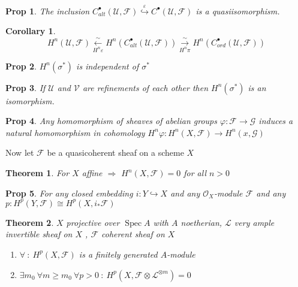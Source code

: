 \documentclass[a4paper, 12pt]{article}
\newcommand{\ca}[1]{\mathcal{#1}}
\newcommand{\caf}{\mathcal{F}}
\newcommand{\cag}{\mathcal{G}}
\newcommand{\oxmod}{$\mathcal{O}_X$-module }
\newtheorem*{prop}{Prop}
\newtheorem*{thm}{Theorem}
\newtheorem*{cor}{Corollary}
\DeclareMathOperator{\spec}{Spec}
\begin{document}
	\begin{prop}
		The inclusion $ C^{\bullet}_{alt}(\ca{U}, \caf) \overset{\varepsilon}{\hookrightarrow} C^{\bullet} (\ca{U}, \caf) $ is a quasiisomorphism.
	\end{prop}
	
	\begin{cor}
		\[ H^n(\ca{U},\caf) \overset{\sim}{\underset{H^n\varepsilon}{\longleftarrow}}  H^n(C^{\bullet}_{alt}( \ca{U}, \caf)) \overset{\sim}{\underset{H^n\pi}{\longrightarrow}} H^n (C^{\bullet}_{ord}(\ca{U}, \caf)) \]
	\end{cor}
	
	\begin{prop}
		$ H^n(\sigma^*) $ is independent of $ \sigma^* $
	\end{prop}
	
	\begin{prop}
		If $ \ca{U} $ and $ \ca{V} $ are refinements of each other then $ H^n(\sigma^*) $ is an isomorphism.
	\end{prop}
	
	
	\begin{prop}
		Any homomorphism of sheaves of abelian groups $ \varphi: \caf \rightarrow \cag $ induces a natural homomorphism in cohomology $ H^n\varphi : H^n(X,\caf) \rightarrow H^n(x, \cag) $
	\end{prop}
		
	Now let $ \caf $ be a quasicoherent sheaf on a scheme $ X $
	
	\begin{thm}
		For $ X $ affine $  \Rightarrow $ $ H^n(X, \caf) = 0 $ for all $ n > 0 $
	\end{thm}
	
	\begin{prop}
		For any closed embedding $ i: Y \hookrightarrow X $ and any \oxmod $ \caf $ and any $ p: H^p(Y,\caf) \cong H^p(X, i_{*} \caf) $
	\end{prop}
		
	\begin{thm}
		$ X $ projective over $ \spec A $ with $ A $ noetherian, $ \ca{L} $ very ample invertible sheaf on $ X $ , $ \caf $ coherent sheaf on $ X $
		
		\begin{enumerate}
			\item $ \forall \: : \: H^p(X,\caf) $ is a finitely generated $ A $-module
			\item $ \exists m_0 \: \forall m \geq m_0 \: \forall p > 0 \: : \: H^p(X, \caf \otimes \ca{L}^{\otimes m}) = 0 $
		\end{enumerate}
	\end{thm}
	
\end{document}
